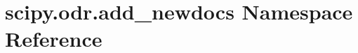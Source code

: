 \hypertarget{namespacescipy_1_1odr_1_1add__newdocs}{}\section{scipy.\+odr.\+add\+\_\+newdocs Namespace Reference}
\label{namespacescipy_1_1odr_1_1add__newdocs}
